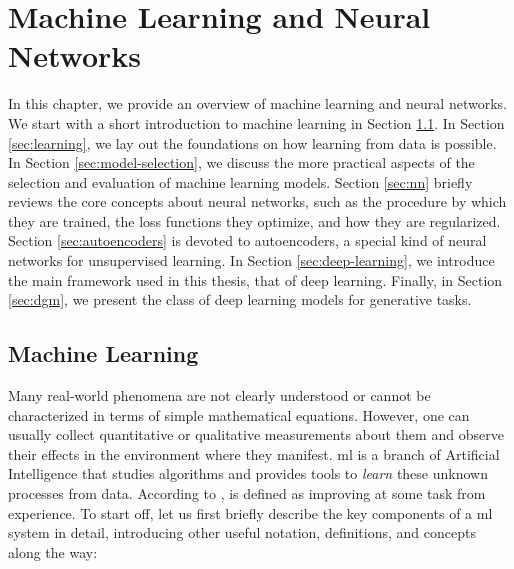 \chapter{Machine Learning and Neural Networks}\label{ch:neural-networks}
In this chapter, we provide an overview of machine learning and neural networks. We start with a short introduction to machine learning in Section \ref{sec:ml}. In Section \ref{sec:learning}, we lay out the foundations on how learning from data is possible. In Section \ref{sec:model-selection}, we discuss the more practical aspects of the selection and evaluation of machine learning models. Section \ref{sec:nn} briefly reviews the core concepts about neural networks, such as the procedure by which they are trained, the loss functions they optimize, and how they are regularized. Section \ref{sec:autoencoders} is devoted to autoencoders, a special kind of neural networks for unsupervised learning. In Section \ref{sec:deep-learning}, we introduce the main framework used in this thesis, that of deep learning. Finally, in Section \ref{sec:dgm}, we present the class of deep learning models for generative tasks.

\section{Machine Learning}\label{sec:ml}
Many real-world phenomena are not clearly understood or cannot be characterized in terms of simple mathematical equations. However, one can usually collect quantitative or qualitative measurements about them and observe their effects in the environment where they manifest. \gls{ml} is a branch of Artificial Intelligence that studies algorithms and provides tools to \emph{learn} these unknown processes from data. According to \citet{mitchell1997ml},  is defined as improving at some task from experience. To start off, let us first briefly describe the key components of a \gls{ml} system in detail, introducing other useful notation, definitions, and concepts along the way:

